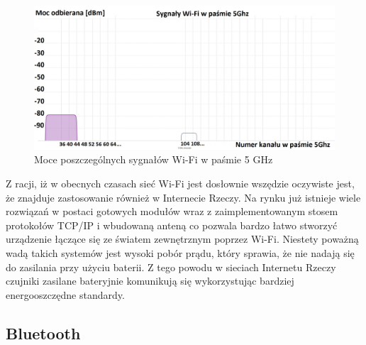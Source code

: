 \documentclass[12pt, twoside, openany]{mwrep}
\begin{document}
\begin{figure}[H]
\centering
\includegraphics[scale=0.35]{5GHz}
\caption{Moce poszczególnych sygnałów Wi-Fi w paśmie 5 GHz}
\end{figure}

\par
Z racji, iż w obecnych czasach sieć Wi-Fi jest dosłownie wszędzie oczywiste jest, że znajduje zastosowanie również w Internecie Rzeczy. Na rynku już istnieje wiele rozwiązań w postaci gotowych modułów wraz z zaimplementowanym stosem protokołów TCP/IP i wbudowaną anteną co pozwala bardzo łatwo stworzyć urządzenie łączące się ze światem zewnętrznym poprzez Wi-Fi. Niestety poważną wadą takich systemów jest wysoki pobór prądu, który sprawia, że nie nadają się do zasilania przy użyciu baterii. Z tego powodu w sieciach Internetu Rzeczy czujniki zasilane bateryjnie komunikują się wykorzystując bardziej energooszczędne standardy.

\subsection{Bluetooth}
\end{document}
